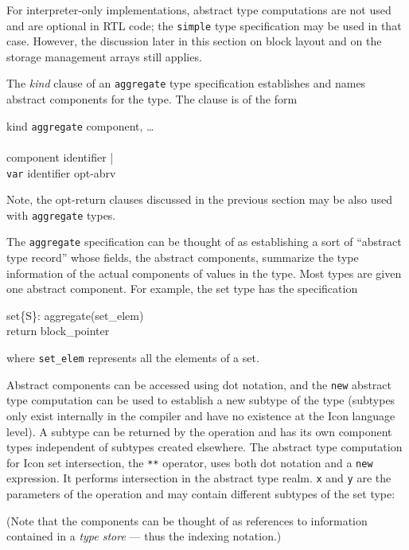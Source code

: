 For interpreter-only implementations, abstract type computations are not
used and are optional in RTL code; the \texttt{simple} type specification
may be used in that case. However, the discussion later in this section on
block layout and on the storage management arrays still applies.


The \textit{kind} clause of an \texttt{aggregate} type specification
establishes and names abstract components for the type. The clause is of
the form

\begin{ebnf}
kind \cceq \texttt{aggregate} \toklbra component, \ldots \tokrbra\\
\\
component \cceq identifier |\\
\>\>\>\>\>       \texttt{var} identifier opt-abrv
\end{ebnf}

\noindent
Note, the opt-return clauses discussed in the previous section may be
also used with \texttt{aggregate} types.

The \texttt{aggregate} specification can be thought of as establishing a
sort of ``abstract type record'' whose fields, the abstract components,
summarize the type information of the actual components of values in the
type. Most types are given one abstract component. For example, the set
type has the specification
\begin{iconcode}
set\{S\}: \>\>\> aggregate(set\_elem)\\
\>\>\>           return block\_pointer
\end{iconcode}
\noindent
where \texttt{set\_elem} represents all the elements of a set.


Abstract components can be accessed using dot notation, and the
\texttt{new} abstract type computation can be used to establish a
new subtype of the type (subtypes only exist internally in the
compiler and have no existence at the Icon language level). A subtype
can be returned by the operation and has its own component types
independent of subtypes created elsewhere. The abstract type
computation for Icon set intersection, the \texttt{**} operator, uses
both dot notation and a \texttt{new} expression. It performs
intersection in the abstract type realm. \texttt{x} and \texttt{y} are
the parameters of the operation and may contain different subtypes of
the set type:

\noindent
(Note that the components can be thought of as references to
information contained in a \textit{type store} --- thus the indexing notation.)

